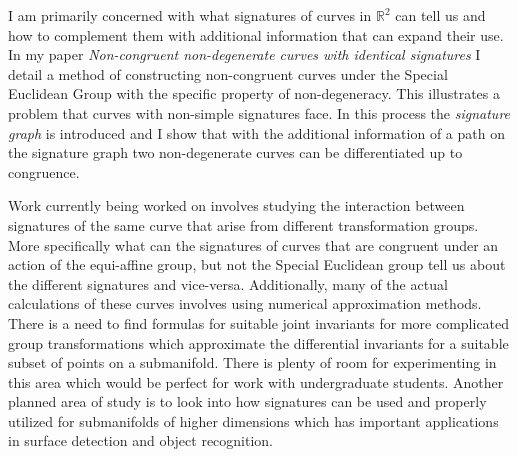 \documentclass[12pt]{letter}
\begin{document}
\quad I am primarily concerned with what signatures of curves in $\mathbb{R}^2$ can tell us  and how to complement them with additional information that can expand their use.  In my paper \emph{Non-congruent non-degenerate curves with identical signatures} I detail a method of constructing non-congruent curves under the Special Euclidean Group with the specific property of non-degeneracy.  This illustrates a problem that curves with non-simple signatures face.  In this process the \emph{signature graph} is introduced and I show that with the additional information of a path on the signature graph two non-degenerate curves can be differentiated up to congruence.

\quad Work currently being worked on involves studying the interaction between signatures of the same curve that arise from different transformation groups.  More specifically what can the signatures of curves that are congruent under an action of the equi-affine group, but not the Special Euclidean group tell us about the different signatures and vice-versa.
Additionally, many of the actual calculations of these curves involves using numerical approximation methods.  There is a need to find formulas for suitable joint invariants for more complicated group transformations which approximate the differential invariants for a suitable subset of points on a submanifold.  There is plenty of room for experimenting in this area which would be perfect for work with undergraduate students.  Another planned area of study is to look  into how signatures can be used and properly utilized for submanifolds of higher dimensions which has important applications in surface detection and object recognition.
\end{document}
